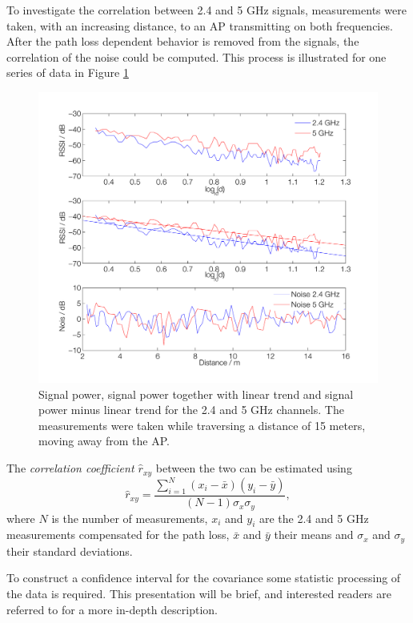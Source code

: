 \documentclass{LTHthesis}
\begin{document}
To investigate the correlation between 2.4 and 5 GHz signals, measurements were taken, with an increasing distance, to an AP transmitting on both frequencies. After the path loss dependent behavior is removed from the signals, the correlation of the noise could be computed. This process is illustrated for one series of data in Figure \ref{noise_corr_los} 
%
\begin{figure}[!hbt]

\includegraphics[width=1\textwidth ]{images/wifi/noise_corr_los}
\caption{Signal power, signal power together with linear trend and signal power minus linear trend for the 2.4 and 5 GHz channels. The measurements were taken while traversing a distance of 15 meters, moving away from the AP.}\label{noise_corr_los}
\end{figure}

The \emph{correlation coefficient $\hat  r_{xy}$} between the two can be estimated using
\begin{equation}
\hat r_{xy}=\frac{\sum\limits_{i=1}^{N}{(x_i-\bar{x})(y_i-\bar{y})}}{(N-1)\sigma_x\sigma_y},
\end{equation}
where $N$ is the number of measurements, $x_i$ and $y_i$ are the 2.4 and 5 GHz measurements compensated for the path loss, $\bar x$ and $\bar y$ their means and $\sigma_x$ and $\sigma_y$ their standard deviations. 

To construct a confidence interval for the covariance some statistic processing of the data is required. This presentation will be brief, and interested readers are referred to \cite{fisher15, fisher21}  for a more in-depth description. 
\end{document}
